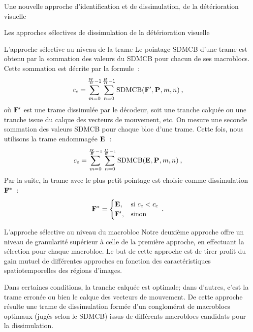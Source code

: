\begin{chapter}{Une nouvelle approche d'identification et de dissimulation, de
la détérioration visuelle}
\begin{section}{Les approches sélectives de dissimulation de la détérioration
visuelle}
\begin{subsection}{L'approche sélective au niveau de la trame}
Le pointage SDMCB d'une trame est obtenu par la sommation des valeurs du SDMCB
pour chacun de ses macroblocs. Cette sommation est décrite par la formule~:
\begin{equation}
\label{eq-ConcealmentCandidate}
c_c=\sum_{m=0}^{\frac{W}{B}-1}\sum_{n=0}^{\frac{H}{B}-1}\textrm{SDMCB}(\mathbf{F^{\prime}}_{},\mathbf{P}_{},m,n)\:,
\end{equation}
où $\mathbf{F^{\prime}}_{}$ est une trame dissimulée par le décodeur, soit une tranche
calquée ou une tranche issue du calque des vecteurs de mouvement, etc. On
mesure une seconde sommation des valeurs SDMCB pour chaque bloc d'une trame.
Cette fois, nous utilisons la trame endommagée $\mathbf{E}_{}$~:
\begin{equation}
\label{eq-ErroneousCandidate}
c_e=\sum_{m=0}^{\frac{W}{B}-1}\sum_{n=0}^{\frac{H}{B}-1}\textrm{SDMCB}(\mathbf{E}_{},\mathbf{P}_{},m,n)\:,
\end{equation}
Par la suite, la trame avec le plus petit pointage est choisie comme
dissimulation $\mathbf{F^{*}}_{}$~:
\begin{equation}
\label{eq-SelectiveConcealment}
\mathbf{F^{*}}_{} =
\begin{cases}
\mathbf{E}_{}, & \mathrm{si~} c_e < c_c\\
\mathbf{F^{\prime}}_{}, & \mathrm{sinon}
\end{cases}\:.
\end{equation}

\end{subsection}

\begin{subsection}{L'approche sélective au niveau du macrobloc}
\label{sect-SelectiveBloc}
Notre deuxième approche offre un niveau de granularité supérieur à celle de la
première approche, en effectuant la sélection pour chaque macrobloc. Le but de
cette approche est de tirer profit du gain mutuel de différentes approches en
fonction des caractéristiques spatiotemporelles des régions d'images.

Dans certaines conditions, la tranche calquée est optimale; dans d'autres, c'est
la trame erronée ou bien le calque des vecteurs de mouvement. De cette approche
résulte une trame de dissimulation formée d'un conglomérat de macroblocs
optimaux (jugés selon le SDMCB) issus de différents macroblocs candidats pour
la dissimulation.


\end{subsection}
\end{section}
\end{chapter}
